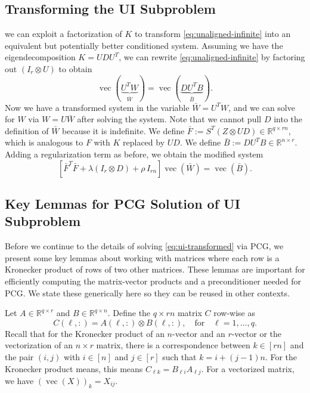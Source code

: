 \documentclass{article}
\DeclareMathOperator{\vecop}{vec}
\theoremstyle{plain} %
\begin{document}
\subsection{Transforming the UI Subproblem}
\label{sec:transformed-ui}
we can exploit a factorization of $K$ 
to transform \cref{eq:unaligned-infinite} 
into an equivalent but potentially better conditioned system.
Assuming we have the eigendecomposition 
$K = U D U^T$,
we can rewrite \cref{eq:unaligned-infinite} 
by factoring out $(I_r \otimes U)$ to obtain
\begin{equation}
    [{
        \underbrace{(Z \otimes UD)^T S}_{\bar{F}^T}
        \underbrace{S^T (Z \otimes UD)}_{\bar{F}}
    + \lambda  (I_r \otimes D) 
    }] \vecop(\underbrace{U^TW}_{\bar{W}})
    =  \vecop(\underbrace{DU^TB}_{\bar{B}}).
\end{equation}
Now we have a transformed system in the variable $\bar{W} = U^T W$,
and we can solve for $W$ via $W = U \bar{W}$ after solving the system.
Note that we cannot pull $D$ into the definition of $\bar{W}$ because it is indefinite.
We define $\bar{F} := S^T (Z \otimes UD) \in \mathbb{R}^{q \times rn}$,
which is analogous to $F$ with $K$ replaced by $UD$.
We define $\bar{B} := D U^T B \in \mathbb{R}^{n \times r}$.
Adding a regularization term as before,
we obtain the modified system
\begin{equation}
    \label{eq:ui-transformed}
    [   
        \bar{F}^T \bar{F} + \lambda (I_r \otimes D) + \rho \, I_{rn}
    ]
    \vecop(\bar{W})
    = \vecop(\bar{B}).
\end{equation}

\subsection{Key Lemmas for PCG Solution of UI Subproblem}
\label{app:unaligned-lemmas}
Before we continue to the details of solving \cref{eq:ui-transformed} via PCG,
we present some key lemmas about working with matrices where each row is a Kronecker product of rows of two other matrices.
These lemmas are important for efficiently computing the matrix-vector products and a preconditioner needed for PCG. We state these generically here so they can be reused in other contexts.

Let $A \in \mathbb{R}^{q \times r}$ and $B \in \mathbb{R}^{q \times n}$.  Define the $q \times rn$ matrix $C$ row-wise as
\begin{equation}\label{eq:FAB}
    C(\ell,:) = A(\ell,:) \otimes B(\ell,:), 
    \quad \text{for} \quad \ell=1,\ldots,q.
\end{equation} 
Recall that for the Kronecker product of an $n$-vector and an $r$-vector or the vectorization of an $n \times r$ matrix, there is a correspondence between $k \in [rn]$ and the pair $(i,j)$ with $i \in [n]$ and $j \in [r]$ such that $k = i + (j-1)n$.
For the Kronecker product means, this means $C_{\ell k} = B_{\ell i} A_{\ell j}$.
For a vectorized matrix, we have $(\vecop(X))_k = X_{ij}$.
\end{document}
